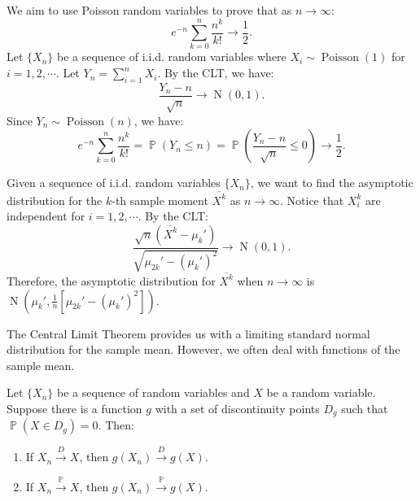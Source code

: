 \documentclass{huhtakm-template-book-v2}
\DeclareMathOperator{\prob}{\mathbb{P}}
\DeclareMathOperator{\Poisson}{Poisson}
\DeclareMathOperator{\N}{N}
\begin{document}
    \begin{eg}
        We aim to use Poisson random variables to prove that as $n \to \infty$:
        \begin{equation*}
            e^{-n} \sum_{k=0}^{n} \frac{n^{k}}{k!} \to \frac{1}{2}.
        \end{equation*}
        Let $\{X_{n}\}$ be a sequence of i.i.d. random variables where $X_{i} \sim \Poisson(1)$ for $i = 1, 2, \cdots$. Let $Y_{n} = \sum_{i=1}^{n} X_{i}$. By the CLT, we have:
        \begin{equation*}
            \frac{Y_{n} - n}{\sqrt{n}} \to \N(0, 1).
        \end{equation*}
        Since $Y_{n} \sim \Poisson(n)$, we have:
        \begin{equation*}
            e^{-n} \sum_{k=0}^{n} \frac{n^{k}}{k!} = \prob(Y_{n} \leq n) = \prob\left(\frac{Y_{n} - n}{\sqrt{n}} \leq 0\right) \to \frac{1}{2}.
        \end{equation*}
    \end{eg}
    \begin{eg}
        Given a sequence of i.i.d. random variables $\{X_{n}\}$, we want to find the asymptotic distribution for the $k$-th sample moment $\overline{X^{k}}$ as $n \to \infty$. Notice that $X_{i}^{k}$ are independent for $i = 1, 2, \cdots$. By the CLT:
        \begin{equation*}
            \frac{\sqrt{n}(\overline{X^{k}} - \mu_{k}')}{\sqrt{\mu_{2k}' - (\mu_{k}')^{2}}} \to \N(0, 1).
        \end{equation*}
        Therefore, the asymptotic distribution for $\overline{X^{k}}$ when $n \to \infty$ is $\N\left(\mu_{k}', \frac{1}{n}[\mu_{2k}' - (\mu_{k}')^{2}]\right)$.
    \end{eg}
    The Central Limit Theorem provides us with a limiting standard normal distribution for the sample mean. However, we often deal with functions of the sample mean.
    \begin{thm}
        Let $\{X_{n}\}$ be a sequence of random variables and $X$ be a random variable. Suppose there is a function $g$ with a set of discontinuity points $D_{g}$ such that $\prob(X \in D_{g}) = 0$. Then:
        \begin{enumerate}
            \item If $X_{n} \xrightarrow{D} X$, then $g(X_{n}) \xrightarrow{D} g(X)$.
            \item If $X_{n} \xrightarrow{\prob} X$, then $g(X_{n}) \xrightarrow{\prob} g(X)$.
        \end{enumerate}
    \end{thm}
\end{document}
